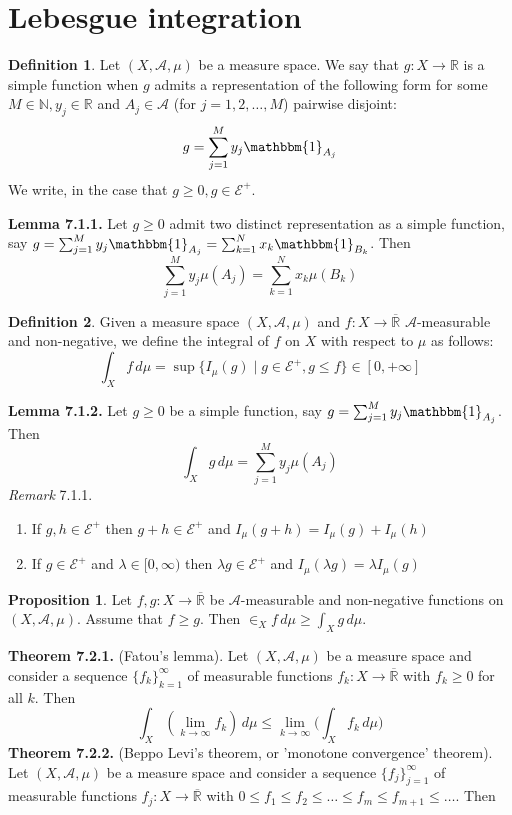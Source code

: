 \documentclass[a4paper,14pt]{extarticle}
\theoremstyle{definition}
\newtheorem{definition}{Definition}
\newtheorem{proposition}{Proposition}
\begin{document}
\section{Lebesgue integration}
\begin{definition}
  Let $(X,\mathcal{A},\mu)$ be a measure space. We say that $g:X\rightarrow\mathbb{R}$ is a simple function when $g$ admits a representation of the following form for some $M\in\mathbb{N}, y_j\in\mathbb{R}$ and $A_j\in\mathcal{A}$ (for $j=1,2,\ldots,M$) pairwise disjoint:
  \[g=\sum_{j=1}^M y_j\mathbbm{1}_{A_j}\]
  We write, in the case that $g\geq0, g\in\mathcal{E}^+$.
\end{definition}
\noindent\textbf{Lemma 7.1.1.} Let $g\geq0$ admit two distinct representation as a simple function, say $g=\sum_{j=1}^M y_j\mathbbm{1}_{A_j}=\sum_{k=1}^N x_k\mathbbm{1}_{B_k}$. Then \[\sum_{j=1}^M y_j\mu(A_j)=\sum_{k=1}^N x_k\mu(B_k)\]
\begin{definition}
  Given a measure space $(X,\mathcal{A},\mu)$ and $f:X\rightarrow\overline{\mathbb{R}}$ $\mathcal{A}$-measurable and non-negative, we define the integral of $f$ on $X$ with respect to $\mu$ as follows:
  \[\int_X f\,d\mu=\sup\{I_\mu(g)\mid g\in\mathcal{E}^+,g\leq f\}\in[0,+\infty]\]
\end{definition}
\noindent\textbf{Lemma 7.1.2.} Let $g\geq0$ be a simple function, say $g=\sum_{j=1}^M y_j\mathbbm{1}_{A_j}$. Then \[\int_X g\,d\mu=\sum_{j=1}^M y_j\mu(A_j)\]
\noindent\textit{Remark} 7.1.1.
\begin{enumerate}
  \item If $g,h\in\mathcal{E}^+$ then $g+h\in\mathcal{E}^+$ and $I_\mu(g+h)=I_\mu(g)+I_\mu(h)$
  \item If $g\in\mathcal{E}^+$ and $\lambda\in[0,\infty)$ then $\lambda g\in\mathcal{E}^+$ and $I_\mu(\lambda g)=\lambda I_\mu(g)$
\end{enumerate}
\begin{proposition}
  Let $f,g:X\rightarrow\overline{\mathbb{R}}$ be $\mathcal{A}$-measurable and non-negative functions on $(X,\mathcal{A},\mu)$. Assume that $f\geq g$. Then 
  $\in_X f\,d\mu\geq\int_X g\,d\mu$.
\end{proposition}
\noindent\textbf{Theorem 7.2.1.} (Fatou's lemma). Let $(X,\mathcal{A},\mu)$ be a measure space and consider a sequence $\{f_k\}_{k=1}^\infty$ of measurable functions $f_k:X\rightarrow\overline{\mathbb{R}}$ with $f_k\geq0$ for all $k$. Then 
\[\int_X (\lim\limits_{k\to\infty} f_k)\,d\mu\leq\lim\limits_{k\to\infty}\bigl(\int_X f_k \,d\mu\bigr)\]
\noindent\textbf{Theorem 7.2.2.} (Beppo Levi's theorem, or 'monotone convergence' theorem). Let $(X,\mathcal{A},\mu)$ be a measure space and consider a sequence $\{f_j\}_{j=1}^\infty$ of measurable functions $f_j:X\rightarrow\overline{\mathbb{R}}$ with $0\leq f_1\leq f_2\leq\ldots\leq f_m\leq f_{m+1}\leq\ldots$. Then 
\end{document}
